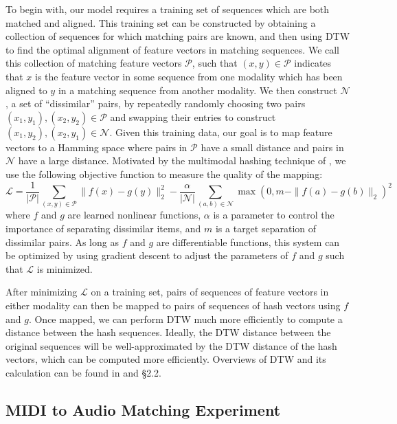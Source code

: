 \documentclass{article} %
\begin{document}
To begin with, our model requires a training set of sequences which are both matched and aligned.
This training set can be constructed by obtaining a collection of sequences for which matching pairs are known, and then using DTW to find the optimal alignment of feature vectors in matching sequences.
We call this collection of matching feature vectors $\mathcal{P}$, such that $(x, y) \in \mathcal{P}$ indicates that $x$ is the feature vector in some sequence from one modality which has been aligned to $y$ in a matching sequence from another modality.
We then construct $\mathcal{N}$, a set of ``dissimilar'' pairs, by repeatedly randomly choosing two pairs $(x_1, y_1), (x_2, y_2) \in \mathcal{P}$ and swapping their entries to construct $(x_1, y_2), (x_2, y_1) \in \mathcal{N}$.
Given this training data, our goal is to map feature vectors to a Hamming space where pairs in $\mathcal{P}$ have a small distance and pairs in $\mathcal{N}$ have a large distance.
Motivated by the multimodal hashing technique of \cite{masci2014multimodal}, we use the following objective function to measure the quality of the mapping:
\begin{equation*}
\mathcal{L} = \frac{1}{|\mathcal{P}|} \sum_{(x, y) \in \mathcal{P}} \| f(x) - g(y) \|_2^2  - \frac{\alpha}{|\mathcal{N}|} \sum_{(a, b) \in \mathcal{N}} \max(0, m - \|f(a) - g(b) \|_2)^2
\end{equation*}
where $f$ and $g$ are learned nonlinear functions, $\alpha$ is a parameter to control the importance of separating dissimilar items, and $m$ is a target separation of dissimilar pairs.
As long as $f$ and $g$ are differentiable functions, this system can be optimized by using gradient descent to adjust the parameters of $f$ and $g$ such that $\mathcal{L}$ is minimized.

After minimizing $\mathcal{L}$ on a training set, pairs of sequences of feature vectors in either modality can then be mapped to pairs of sequences of hash vectors using $f$ and $g$.
Once mapped, we can perform DTW much more efficiently to compute a distance between the hash sequences.
Ideally, the DTW distance between the original sequences will be well-approximated by the DTW distance of the hash vectors, which can be computed more efficiently.
Overviews of DTW and its calculation can be found in \cite{muller2007dynamic, rakthanmanon2012searching} and \cite{raffel2015large} \S 2.2.

\subsection{MIDI to Audio Matching Experiment}
\label{sec:hashing}
\end{document}
